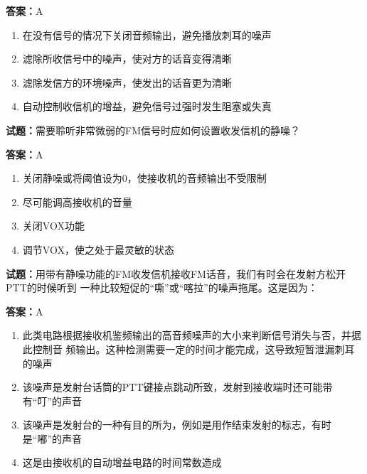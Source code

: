 \documentclass{ctexbook}
\begin{document}
\textbf{答案：}A 

\begin{enumerate}[leftmargin=3em]
  \item 在没有信号的情况下关闭音频输出，避免播放刺耳的噪声 

  \item 滤除所收信号中的噪声，使对方的话音变得清晰 

  \item 滤除发信方的环境噪声，使发出的话音更为清晰 

  \item 自动控制收信机的增益，避免信号过强时发生阻塞或失真 

\end{enumerate}





\vspace{1em}

\textbf{试题：}需要聆听非常微弱的FM信号时应如何设置收发信机的静噪？ 

\textbf{答案：}A 

\begin{enumerate}[leftmargin=3em]
  \item 关闭静噪或将阈值设为0，使接收机的音频输出不受限制 

  \item 尽可能调高接收机的音量 

  \item 关闭VOX功能 

  \item 调节VOX，使之处于最灵敏的状态 

\end{enumerate}






\vspace{1em}

\textbf{试题：}用带有静噪功能的FM收发信机接收FM话音，我们有时会在发射方松开PTT的时候听到
一种比较短促的“嘶”或“喀拉”的噪声拖尾。这是因为： 

\textbf{答案：}A 

\begin{enumerate}[leftmargin=3em]
  \item 此类电路根据接收机鉴频输出的高音频噪声的大小来判断信号消失与否，并据此控制音
频输出。这种检测需要一定的时间才能完成，这导致短暂泄漏刺耳的噪声 

  \item 该噪声是发射台话筒的PTT键接点跳动所致，发射到接收端时还可能带有“叮”的声音 

  \item 该噪声是发射台的一种有目的所为，例如是用作结束发射的标志，有时是“嘟”的声音 

  \item 这是由接收机的自动增益电路的时间常数造成 

\end{enumerate}
\end{document}
